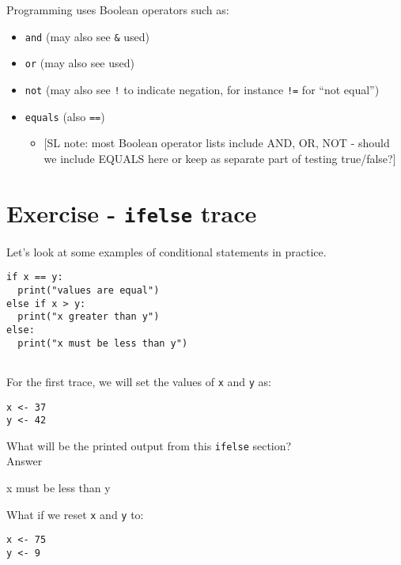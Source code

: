 \documentclass[
]{book}
\providecommand{\tightlist}{%
  \setlength{\itemsep}{0pt}\setlength{\parskip}{0pt}}
\begin{document}
Programming uses Boolean operators such as:\\

\begin{itemize}
\tightlist
\item
  \texttt{and} (may also see \texttt{\&} used)
\item
  \texttt{or} (may also see \texttt{\textbar{}} used)
\item
  \texttt{not} (may also see \texttt{!} to indicate negation, for instance \texttt{!=} for ``not equal'')
\item
  \texttt{equals} (also \texttt{==})

  \begin{itemize}
  \tightlist
  \item
    {[}SL note: most Boolean operator lists include AND, OR, NOT - should we include EQUALS here or keep as separate part of testing true/false?{]}
  \end{itemize}
\end{itemize}

\section{\texorpdfstring{Exercise - \texttt{ifelse} trace}{Exercise - ifelse trace}}\label{exercise---ifelse-trace}

Let's look at some examples of conditional statements in practice.

\begin{verbatim}
if x == y:
  print("values are equal")
else if x > y:
  print("x greater than y")
else:
  print("x must be less than y")
  
\end{verbatim}

For the first trace, we will set the values of \texttt{x} and \texttt{y} as:

\begin{verbatim}
x <- 37
y <- 42
\end{verbatim}

What will be the printed output from this \texttt{ifelse} section?\\

Answer

x must be less than y

\hfill\break

What if we reset \texttt{x} and \texttt{y} to:

\begin{verbatim}
x <- 75
y <- 9
\end{verbatim}
\end{document}
